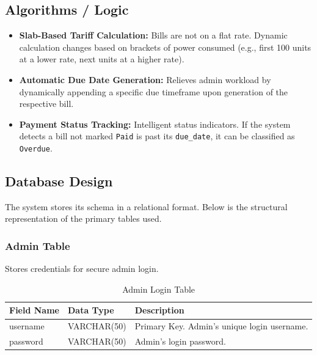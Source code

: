 \documentclass[a4paper,12pt]{article}
\begin{document}
\subsection{Algorithms / Logic}
\begin{itemize}
    \item \textbf{Slab-Based Tariff Calculation:} Bills are not on a flat rate. Dynamic calculation changes based on brackets of power consumed (e.g., first 100 units at a lower rate, next units at a higher rate).
    \item \textbf{Automatic Due Date Generation:} Relieves admin workload by dynamically appending a specific due timeframe upon generation of the respective bill.
    \item \textbf{Payment Status Tracking:} Intelligent status indicators. If the system detects a bill not marked \texttt{Paid} is past its \texttt{due\_date}, it can be classified as \texttt{Overdue}.
\end{itemize}

\subsection{Database Design}
The system stores its schema in a relational format. Below is the structural representation of the primary tables used.

\subsubsection*{Admin Table}
Stores credentials for secure admin login.
\begin{table}[H]
\centering
\begin{tabularx}{\textwidth}{|l|l|X|}
\hline
\textbf{Field Name} & \textbf{Data Type} & \textbf{Description} \\ \hline
username & VARCHAR(50) & Primary Key. Admin's unique login username. \\ \hline
password & VARCHAR(50) & Admin's login password. \\ \hline
\end{tabularx}
\caption{Admin Login Table}
\end{table}
\end{document}
